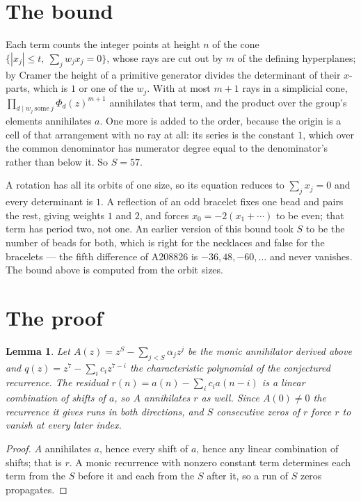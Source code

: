 \documentclass[11pt,a4paper]{article}
\theoremstyle{plain}
\newtheorem{lemma}[theorem]{Lemma}
\theoremstyle{definition}
\begin{document}
\section{The bound}

Each term counts the integer points at height $n$ of the cone
$\{|x_j|\le t,\ \sum_j w_jx_j=0\}$, whose rays are cut out by $m$ of the defining
hyperplanes; by Cramer the height of a primitive generator divides the determinant of their
$x$-parts, which is $1$ or one of the $w_j$. With at most $m+1$ rays in a simplicial cone,
$\prod_{d\mid w_j\ \text{some}\ j}\Phi_d(z)^{m+1}$ annihilates that term, and the product
over the group's elements annihilates $a$. One more is added to the order, because the origin
is a cell of that arrangement with no ray at all: its series is the constant $1$, which over
the common denominator has numerator degree equal to the denominator's rather than below it.
So $S=57$.

A rotation has all its orbits of one size, so its equation reduces to $\sum_jx_j=0$ and every
determinant is $1$. A reflection of an odd bracelet fixes one bead and pairs the rest, giving
weights $1$ and $2$, and forces $x_0=-2(x_1+\cdots)$ to be even; that term has period two, not
one. An earlier version of this bound took $S$ to be the number of beads for both, which is
right for the necklaces and false for the bracelets --- the fifth difference of A208826 is
$-36, 48, -60, \dots$ and never vanishes. The bound above is computed from the orbit sizes.

\section{The proof}

\begin{lemma}\label{lem:crit}
Let $A(z)=z^S-\sum_{j<S}\alpha_jz^{j}$ be the monic annihilator derived above and
$q(z)=z^{7}-\sum_ic_iz^{7-i}$ the characteristic polynomial of the conjectured
recurrence. The residual $r(n)=a(n)-\sum_ic_ia(n-i)$ is a linear combination of shifts of $a$,
so $A$ annihilates $r$ as well. Since $A(0)\ne0$ the recurrence it gives runs in both
directions, and $S$ consecutive zeros of $r$ force $r$ to vanish at every later index.
\end{lemma}

\begin{proof}
$A$ annihilates $a$, hence every shift of $a$, hence any linear combination of shifts; that is
$r$. A monic recurrence with nonzero constant term determines each term from the $S$ before it
and each from the $S$ after it, so a run of $S$ zeros propagates.
\end{proof}
\end{document}
